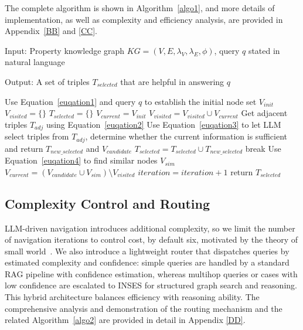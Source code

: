 \documentclass{article}
\theoremstyle{plain}
\theoremstyle{definition}
\theoremstyle{remark}
\begin{document}
The complete algorithm is shown in Algorithm~\ref{algo1}, and more details of implementation, as well as complexity and efficiency analysis, are provided in Appendix~\ref{BB} and \ref{CC}.

\begin{algorithm}[htb]
\caption{Intelligent Navigation and Similarity Enhanced Search (INSES)}
\label{algo1}
Input: Property knowledge graph $KG = (V, E, \lambda_V, \lambda_E, \phi)$, query $q$ stated in natural language

Output: A set of triples $T_{selected}$ that are helpful in answering $q$
\begin{algorithmic}[1] %
\STATE Use Equation~\ref{euqation1} and query $q$ to establish the initial node set $V_{init}$
\STATE $V_{visited}=\{\}$
\STATE $T_{selected}=\{\}$
\STATE $V_{current}=V_{init}$
    \STATE $V_{visited}=V_{visited} \cup V_{current}$
    \STATE Get adjacent triples $T_{adj}$ using Equation~\ref{euqation2}
    \STATE Use Equation~\ref{euqation3} to let LLM select triples from $T_{adj}$, determine whether the current information is sufficient and return $T_{new\_selected}$ and $V_{candidate}$
    \STATE $T_{selected}=T_{selected} \cup T_{new\_selected}$
        \STATE break
    \ENDIF
    \STATE Use Equation~\ref{euqation4} to find similar nodes $V_{sim}$
    \STATE $V_{current}=(V_{candidate} \cup V_{sim}) \setminus V_{visited}$
    \STATE $iteration=iteration+1$
\ENDWHILE
\STATE return $T_{selected}$
\end{algorithmic}
\end{algorithm}

\subsection{Complexity Control and Routing}
LLM-driven navigation introduces additional complexity, so we limit the number of navigation iterations to control cost, by default six, motivated by the theory of small world~\citep{milgram1967small, kleinberg2000small}. We also introduce a lightweight router that dispatches queries by estimated complexity and confidence: simple queries are handled by a standard RAG pipeline with confidence estimation, whereas multihop queries or cases with low confidence are escalated to INSES for structured graph search and reasoning. This hybrid architecture balances efficiency with reasoning ability. The comprehensive analysis and demonstration of the routing mechanism and the related Algorithm~\ref{algo2} are provided in detail in Appendix \ref{DD}.
\end{document}

